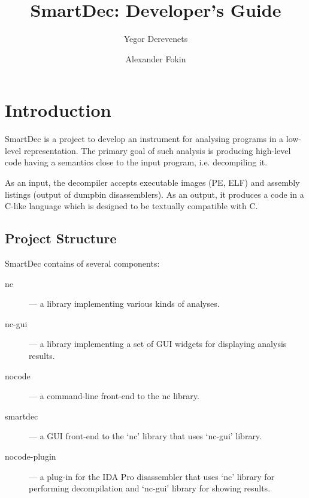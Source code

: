 \documentclass[a4paper,12pt]{article}
\begin{document}
\title{SmartDec: Developer's Guide}
\author{Yegor Derevenets \and Alexander Fokin}

\maketitle
\thispagestyle{empty}
\clearpage

\setcounter{page}{2}


\tableofcontents

\sloppy

\clearpage
\section{Introduction}

SmartDec is a project to develop an instrument for analysing programs in a low-level representation.
The primary goal of such analysis is producing high-level code having a semantics close to the input program, i.e. decompiling it.

As an input, the decompiler accepts executable images (PE, ELF) and assembly listings (output of dumpbin disassemblers).
As an output, it produces a code in a C-like language which is designed to be textually compatible with C.

\subsection{Project Structure}

SmartDec contains of several components:
\begin{description}
\item[nc] --- a library implementing various kinds of analyses.
\item[nc-gui] --- a library implementing a set of GUI widgets for displaying analysis results.
\item[nocode] --- a command-line front-end to the nc library.
\item[smartdec] --- a GUI front-end to the `nc' library that uses `nc-gui' library.
\item[nocode-plugin] --- a plug-in for the IDA Pro disassembler that uses `nc' library for performing decompilation and `nc-gui' library for showing results.
\end{description}
\end{document}
